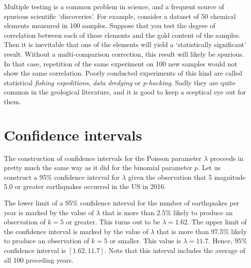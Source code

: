 Multiple testing is a common problem in science, and a frequent source
of spurious scientific `discoveries'. For example, consider a dataset
of 50 chemical elements measured in 100 samples. Suppose that you test
the degree of correlation between each of these elements and the gold
content of the samples. Then it is inevitable that one of the elements
will yield a `statistically significant' result. Without a
multi-comparison correction, this result will likely be spurious. In
that case, repetition of the same experiment on 100 new samples would
not show the same correlation. Poorly conducted experiments of this
kind are called statistical \emph{fishing expeditions}, \emph{data
  dredging} or \emph{p-hacking}. Sadly they are quite common in the
geological literature, and it is good to keep a sceptical eye out for
them.

\section{Confidence intervals}
\label{sec:poisCI}

The construction of confidence intervals for the Poisson parameter
$\lambda$ proceeds in pretty much the same way as it did for the
binomial parameter $p$. Let us construct a 95\% confidence interval
for $\lambda$ given the observation that 5 magnitude 5.0 or greater
earthquakes occurred in the US in 2016.\medskip

The lower limit of a 95\% confidence interval for the number of
earthquakes per year is marked by the value of $\lambda$ that is more
than 2.5\% likely to produce an observation of $k=5$ or greater. This
turns out to be $\lambda=1.62$. The upper limit of the confidence
interval is marked by the value of $\lambda$ that is more than 97.5\%
likely to produce an observation of $k=5$ or smaller. This value is
$\lambda=11.7$. Hence, 95\% confidence interval is $[1.62, 11.7]$.
Note that this interval includes the average of all 100 preceding
years. \medskip

